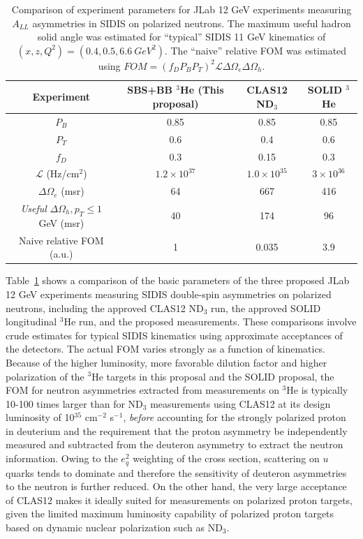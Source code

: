 \begin{table}[h]
  \caption{\label{naiveFOMcomp} Comparison of experiment parameters for JLab 12 GeV experiments measuring $A_{LL}$ asymmetries in SIDIS on polarized neutrons. The maximum useful hadron solid angle was estimated for ``typical'' SIDIS 11 GeV kinematics of $(x,z,Q^2)=(0.4,0.5,6.6\ GeV^2)$. The ``naive'' relative FOM was estimated using $FOM = (f_D P_B P_T)^2 \mathcal{L} \Delta \Omega_e \Delta \Omega_h$.}
  \begin{center}
    \begin{tabular}{cccc}
      \hline \hline Experiment & SBS+BB $^3$He (This proposal) & CLAS12 ND$_3$ & SOLID $^3$He \\ \hline 
      $P_B$ & 0.85 & 0.85 & 0.85 \\ 
      $P_T$ & 0.6 & 0.4 & 0.6 \\
      $f_D$ & 0.3 & 0.15 & 0.3 \\ 
      $\mathcal{L}$ (Hz/cm$^2$) & $1.2 \times 10^{37}$ & $1.0 \times 10^{35}$ & $3 \times 10^{36}$ \\ 
      $\Delta \Omega_e$ (msr) & 64 & 667 & 416 \\
      \emph{Useful} $\Delta \Omega_h, p_T \le 1$ GeV (msr) & 40 & 174 & 96 \\ \hline 
      Naive relative FOM (a.u.) & 1 & 0.035 & 3.9   
    \end{tabular}
  \end{center}
\end{table}
Table~\ref{naiveFOMcomp} shows a comparison of the basic parameters of the three proposed JLab 12 GeV experiments measuring SIDIS double-spin asymmetries on polarized neutrons, including the approved CLAS12 ND$_3$ run, the approved SOLID longitudinal $^3$He run, and the proposed measurements. These comparisons involve crude estimates for typical SIDIS kinematics using approximate acceptances of the detectors. The actual FOM varies strongly as a function of kinematics. Because of the higher luminosity, more favorable dilution factor and higher polarization of the $^3$He targets in this proposal and the SOLID proposal, the FOM for neutron asymmetries extracted from measurements on $^3$He is typically 10-100 times larger than for ND$_3$ measurements using CLAS12 at its design luminosity of 10$^{35}$ cm$^{-2}$ s$^{-1}$, \emph{before} accounting for the strongly polarized proton in deuterium and the requirement that the proton asymmetry be independently measured and subtracted from the deuteron asymmetry to extract the neutron information. Owing to the $e_q^2$ weighting of the cross section, scattering on $u$ quarks tends to dominate and therefore the sensitivity of deuteron asymmetries to the neutron is further reduced. On the other hand, the very large acceptance of CLAS12 makes it ideally suited for measurements on polarized proton targets, given the limited maximum luminosity capability of polarized proton targets based on dynamic nuclear polarization such as ND$_3$. 

